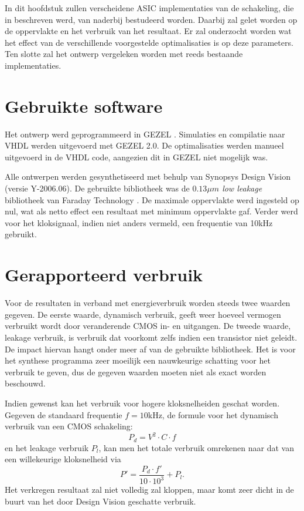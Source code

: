 
In dit hoofdstuk zullen verscheidene ASIC implementaties van de schakeling, die in  beschreven werd, van naderbij bestudeerd worden. Daarbij zal gelet worden op de oppervlakte en het verbruik van het resultaat. Er zal onderzocht worden wat het effect van de verschillende voorgestelde optimalisaties is op deze parameters. Ten slotte zal het ontwerp vergeleken worden met reeds bestaande implementaties.

\section{Gebruikte software}

Het ontwerp werd geprogrammeerd in GEZEL \cite{gezel}. Simulaties en compilatie naar VHDL werden uitgevoerd met GEZEL 2.0. De optimalisaties werden manueel uitgevoerd in de VHDL code, aangezien dit in GEZEL niet mogelijk was.

Alle ontwerpen werden gesynthetiseerd met behulp van Synopsys Design Vision (versie Y-2006.06). De gebruikte bibliotheek was de \emph{$0.13 \mu m$ low leakage} bibliotheek van Faraday Technology \cite{cell-databook}. De maximale oppervlakte werd ingesteld op nul, wat als netto effect een resultaat met minimum oppervlakte gaf. Verder werd voor het kloksignaal, indien niet anders vermeld, een frequentie van 10kHz gebruikt.

\section{Gerapporteerd verbruik}

Voor de resultaten in verband met energieverbruik worden steeds twee waarden gegeven. De eerste waarde, dynamisch verbruik, geeft weer hoeveel vermogen verbruikt wordt door veranderende CMOS in- en uitgangen. De tweede waarde, leakage verbruik, is verbruik dat voorkomt zelfs indien een transistor niet geleidt. De impact hiervan hangt onder meer af van de gebruikte bibliotheek. Het is voor het synthese programma zeer moeilijk een nauwkeurige schatting voor het verbruik te geven, dus de gegeven waarden moeten niet als exact worden beschouwd.


Indien gewenst kan het verbruik voor hogere kloksnelheiden geschat worden. Gegeven de standaard frequentie $f = 10$kHz, de formule voor het dynamisch verbruik van een CMOS schakeling:
\[P_d = V^2 \cdot C \cdot f\]
en het leakage verbruik $P_l$, kan men het totale verbruik omrekenen naar dat van een willekeurige kloksnelheid via
\[P' = \frac{P_d \cdot f'}{10 \cdot 10^3} + P_l.\]
Het verkregen resultaat zal niet volledig zal kloppen, maar komt zeer dicht in de buurt van het door Design Vision geschatte verbruik.

